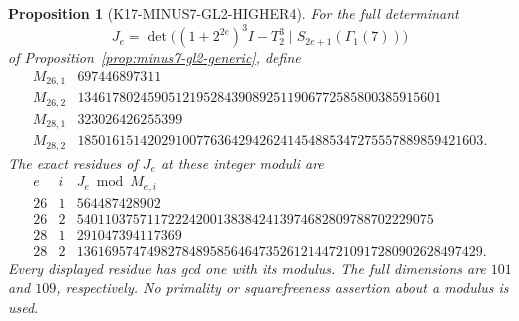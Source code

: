 \documentclass[11pt,a4paper]{article}
\newtheorem{proposition}[theorem]{Proposition}
\theoremstyle{definition}
\begin{document}
\begin{proposition}[K17-MINUS7-GL2-HIGHER4]
\label{prop:minus7-gl2-higher4}
For the full determinant
\[
 J_e=\det\bigl((1+2^{2e})^3I-T_2^3\mid
                  S_{2e+1}(\Gamma_1(7))\bigr)
\]
of Proposition~\ref{prop:minus7-gl2-generic}, define
\[
\begin{array}{c|r}
M_{26,1}&697446897311\\
M_{26,2}&1346178024590512195284390892511906772585800385915601\\
M_{28,1}&323026426255399\\
M_{28,2}&1850161514202910077636429426241454885347275557889859421603.
\end{array}
\tag{G7H4.1}
\]
The exact residues of \(J_e\) at these integer moduli are
\[
\begin{array}{c|c|r}
e&i&J_e\bmod M_{e,i}\\ \hline
26&1&564487428902\\
26&2&540110375711722242001383842413974682809788702229075\\
28&1&291047394117369\\
28&2&1361695747498278489585646473526121447210917280902628497429.
\end{array}
\tag{G7H4.2}
\]
Every displayed residue has gcd one with its modulus.
The full dimensions are \(101\) and \(109\), respectively.
No primality or squarefreeness assertion about a modulus is used.
\end{proposition}
\end{document}
